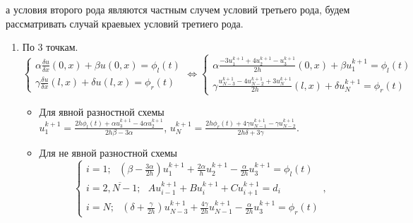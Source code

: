 \documentclass[12pt]{article}
\begin{document}
\begin{enumerate}
    а условия второго рода являются частным случем условий третьего рода, будем рассматривать случай краевыех условий третиего рода.
    \begin{enumerate}
        \item По 3 точкам.
        \begin{equation*}
            \begin{cases}
                \alpha\frac{\delta u}{\delta x}(0,x) + \beta u(0,x)= \phi_l(t)
                \\
                \gamma\frac{\delta u}{\delta x}(l,x) + \delta u(l,x)= \phi_r(t)
            \end{cases}
            \Leftrightarrow
            \begin{cases}
                \alpha\frac{-3u_1^{k+1}+4u_{2}^{k+1}-u_{3}^{k+1}}{2h}(0,x) + \beta u_{1}^{k+1} = \phi_l(t)
                \\
                \gamma\frac{u_{N-3}^{k+1}-4u_{N-2}^{k+1}+3u_N^{k+1}}{2h}(l,x) + \delta u_{N}^{k+1}= \phi_r(t)
            \end{cases}
        \end{equation*}
        \begin{itemize}
            \item Для явной разностной схемы\\
                $u_1^{k+1}=\frac{2h\phi_l(t)+\alpha u_3^{k+1}-4\alpha u_2^{k+1}}{2h\beta-3\alpha}$, 
                $u_N^{k+1}=\frac{2h\phi_r(t)+4\gamma u_{N-1}^{k+1}-\gamma u_{N-2}^{k+1}}{2h\delta+3\gamma}$.
            
            \item  Для не явной разностной схемы\\
                \begin{equation*}
                    \begin{cases}
                        i=1;\:\:\: \left(\beta-\frac{3\alpha}{2h}\right)u_1^{k+1}+ \frac{2\alpha}{h}u_2^{k+1} -\frac{\alpha}{2h}u_{3}^{k+1}=\phi_l(t)
                        \\
                        i=\overline{2,N-1};\:\:\:Au_{i-1}^{k+1} + Bu_i^{k+1} +Cu_{i+1}^{k+1}=d_i
                        \\
                        i=N;\:\:\: \left(\delta+\frac{\gamma}{2h}\right)u_{N-3}^{k+1}+\frac{4\gamma}{2h}u_{N-1}^{k+1} - \frac{\alpha}{2h}u_{3}^{k+1} =\phi_r(t)
                    \end{cases},
                \end{equation*}
        \end{itemize}


\end{enumerate}
\end{enumerate}
\end{document}
